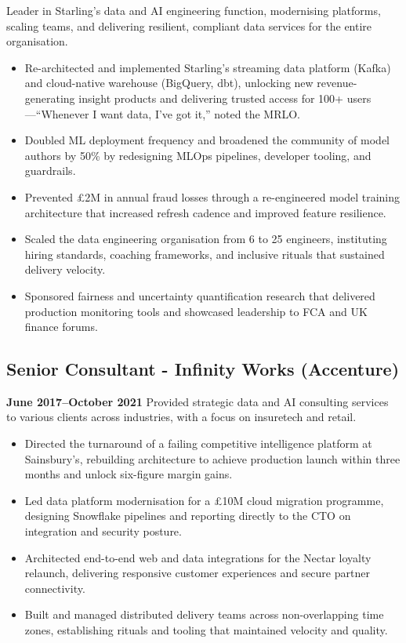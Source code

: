 \documentclass[a4paper]{scrartcl}
\begin{document}
Leader in Starling's data and AI engineering function, modernising platforms, scaling teams, and delivering resilient, compliant data services for the entire organisation.
\begin{itemize}
		\item Re-architected and implemented Starling's streaming data platform (Kafka) and cloud-native warehouse (BigQuery, dbt), unlocking new revenue-generating insight products and delivering trusted access for 100+ users—``Whenever I want data, I've got it,'' noted the MRLO.
	\item Doubled ML deployment frequency and broadened the community of model authors by 50\% by redesigning MLOps pipelines, developer tooling, and guardrails.
	\item Prevented £2M in annual fraud losses through a re-engineered model training architecture that increased refresh cadence and improved feature resilience.
	\item Scaled the data engineering organisation from 6 to 25 engineers, instituting hiring standards, coaching frameworks, and inclusive rituals that sustained delivery velocity.
		\item Sponsored fairness and uncertainty quantification research that delivered production monitoring tools and showcased leadership to FCA and UK finance forums.
\end{itemize}

\subsection*{Senior Consultant - Infinity Works (Accenture)}
\textbf{June 2017--October 2021}
Provided strategic data and AI consulting services to various clients across industries, with a focus on insuretech and retail.
\begin{itemize}
	\item Directed the turnaround of a failing competitive intelligence platform at Sainsbury's, rebuilding architecture to achieve production launch within three months and unlock six-figure margin gains.
	\item Led data platform modernisation for a £10M cloud migration programme, designing Snowflake pipelines and reporting directly to the CTO on integration and security posture.
		\item Architected end-to-end web and data integrations for the Nectar loyalty relaunch, delivering responsive customer experiences and secure partner connectivity.
	\item Built and managed distributed delivery teams across non-overlapping time zones, establishing rituals and tooling that maintained velocity and quality.
\end{itemize}
\end{document}
